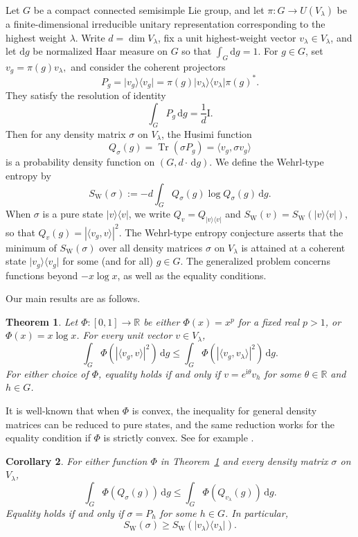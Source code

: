 \documentclass[11pt,reqno]{amsart}
\numberwithin{equation}{section}
\theoremstyle{plain}
\newtheorem{theorem}{Theorem}[section]
\newtheorem{corollary}[theorem]{Corollary}
\theoremstyle{remark}
\newcommand{\R}{\mathbb R}
\newcommand{\ii}{\mathrm i}
\newcommand{\dd}{\,\mathrm d}
\newcommand{\Id}{\mathrm I}
\newcommand{\tr}{\operatorname{Tr}}
\newcommand{\ip}[2]{\langle#1,#2\rangle}
\newcommand{\proj}[1]{\lvert#1\rangle\langle#1\rvert}
\newcommand{\SW}{S_{\mathrm W}}
\begin{document}
Let $G$ be a compact connected semisimple Lie group, and let
$\pi:G\to U(V_\lambda)$ be a finite-dimensional irreducible unitary
representation corresponding to the highest weight $\lambda$.  Write $d=\dim V_\lambda$,
fix a unit highest-weight vector $v_\lambda\in V_\lambda$, and let $\mathrm d g$ be
normalized Haar measure on $G$ so that $\int_G\mathrm d g=1$.
For $g\in G$, set $ v_g=\pi(g)v_\lambda,$ and consider the coherent projectors
\[
 P_g=\proj{v_g}=\pi(g)\proj{v_\lambda}\pi(g)^*.
\]
They satisfy the resolution of identity
\[
 \int_G P_g\dd g=\frac1d\Id.
 \]
 Then for any density matrix $\sigma$ on $V_\lambda$, the Husimi function
 \begin{equation}\label{eq:husimi}
 Q_\sigma(g)=\tr(\sigma P_g)=\ip{v_g}{\sigma v_g}
\end{equation}
is a probability density function on $(G, d\cdot \dd g)$. We define the Wehrl-type entropy by
\begin{equation}
 \SW(\sigma):=-d\int_G Q_\sigma(g)\log Q_\sigma(g)\dd g.
\end{equation}
When $\sigma$ is a pure state $\proj v$,
we write $Q_v=Q_{\proj v}$ and $\SW(v)=\SW(\proj v)$, so that $Q_v(g)=|\ip{v_g}{v}|^2$. The Wehrl-type entropy conjecture asserts that
the minimum of $\SW(\sigma)$ over all density matrices $\sigma$ on $V_\lambda$ is attained at a coherent state $\proj{v_g}$ for some (and for all) $g\in G$.
The generalized problem concerns functions beyond $-x\log x$, as well as the equality conditions.

Our main results are as follows.

\begin{theorem}\label{thm:main}
Let $\Phi:[0,1]\to\R$ be either $\Phi(x)=x^p$ for a fixed real $p>1$,
or $\Phi(x)=x\log x$. For every unit vector $v\in V_\lambda$,
\begin{equation}\label{eq:functional}
 \int_G\Phi(|\langle v_g,v\rangle|^2)\dd g
 \le \int_G\Phi(|\langle v_g,v_\lambda\rangle|^2)\dd g.
\end{equation}
For either choice of $\Phi$, equality holds if and only if
$v=e^{\ii\theta}v_h$ for some $\theta\in\R$ and $h\in G$.
\end{theorem}

It is well-known that when $\Phi$ is convex, the inequality for
general density matrices can be reduced to pure states,
and the same reduction works for the equality condition if $\Phi$ is strictly convex.
See for example \cite[Proof of Corollary~14]{Frank}.

\begin{corollary}\label{cor:density}
For either function $\Phi$ in Theorem~\ref{thm:main} and every density
matrix $\sigma$ on $V_\lambda$,
\begin{equation}\label{eq:densityfunctional}
 \int_G\Phi(Q_\sigma(g))\dd g
 \le \int_G\Phi(Q_{v_\lambda}(g))\dd g.
\end{equation}
Equality holds if and only if $\sigma=P_h$ for some $h\in G$.
In particular,
\begin{equation}\label{eq:entropy}
 \SW(\sigma)\ge\SW(\proj{v_\lambda}).
\end{equation}
\end{corollary}
\end{document}
